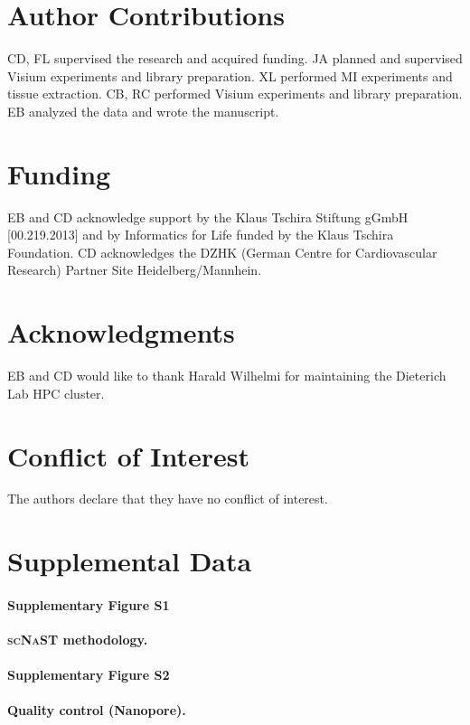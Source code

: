 \documentclass[utf8]{FrontiersinHarvard} %
\newcommand{\scnast}{\textsc{scNaST}\xspace}
\begin{document}
\section*{Author Contributions}
CD, FL supervised the research and acquired funding.
JA planned and supervised Visium experiments and library preparation.
XL performed MI experiments and tissue extraction.
CB, RC performed Visium experiments and library preparation.
EB analyzed the data and wrote the manuscript.

\section*{Funding}
EB and CD acknowledge support by the Klaus Tschira Stiftung gGmbH [00.219.2013] and by Informatics for Life funded by the Klaus Tschira Foundation. 
CD acknowledges the DZHK (German Centre for Cardiovascular Research) Partner Site Heidelberg/Mannhein.

\section*{Acknowledgments}
EB and CD would like to thank Harald Wilhelmi for maintaining the Dieterich Lab HPC cluster.

\section*{Conflict of Interest}
The authors declare that they have no conflict of interest.

\section*{Supplemental Data}

\paragraph*{Supplementary Figure S1}
\label{fig:S1}
{\bf \scnast methodology.}

\paragraph*{Supplementary Figure S2}
\label{fig:S2}
{\bf Quality control (Nanopore).}
\end{document}
